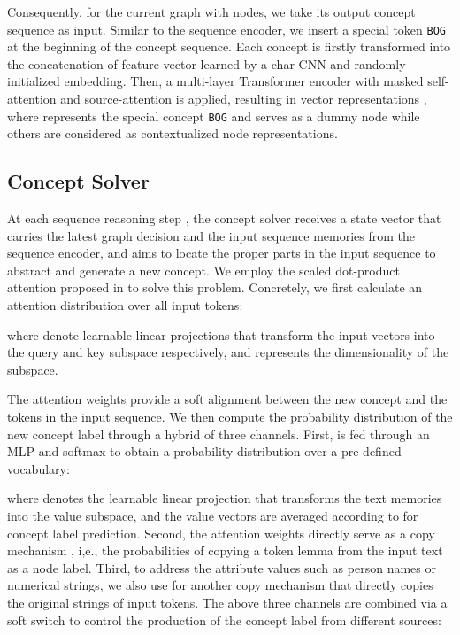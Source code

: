 \documentclass[11pt,a4paper]{article}
\begin{document}
	Consequently, for the current graph  with  nodes, we take its output concept sequence  as input. Similar to the sequence encoder, we insert a special token \texttt{BOG} at the beginning of the concept sequence. Each concept is firstly transformed into the concatenation of feature vector learned by a char-CNN and randomly initialized  embedding. Then, a multi-layer Transformer encoder with masked self-attention and source-attention is applied, resulting in vector representations , where  represents the special concept \texttt{BOG} and serves as a dummy node while others are considered as contextualized node representations.
	\subsection{Concept Solver}
	At each sequence reasoning step , the concept solver receives a state vector  that carries the latest graph decision and the input sequence memories  from the sequence encoder, and aims to locate the proper parts in the input sequence to abstract and generate a new concept. We employ the scaled dot-product attention proposed in  to solve this problem. Concretely, we first calculate an attention distribution over all input tokens:
	
	where  denote learnable linear projections that transform the input vectors into the query and key subspace respectively, and  represents the dimensionality of the subspace.
	
	The attention weights  provide a soft alignment between the new concept and the tokens in the input sequence. We then compute the probability distribution of the new concept label through a hybrid of three channels.
	First,  is fed through an MLP and softmax to obtain a probability distribution over a pre-defined vocabulary:
	
	where  denotes the learnable linear projection that transforms the text memories into the value subspace, and the value vectors are averaged according to  for concept label prediction. Second, the attention weights  directly serve as a copy mechanism \cite{gu2016incorporating,see-etal-2017-get}, i,e., the probabilities of copying a token lemma from the input text as a node label. Third, to address the attribute values such as person names or numerical strings, we also use  for another copy mechanism that directly copies the original strings of input tokens. The above three channels are combined via a soft switch to control the production of the concept label from different sources:
	
\end{document}

